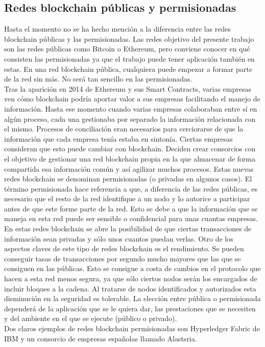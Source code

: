 \subsection{Redes blockchain públicas y permisionadas}
Hasta el momento no se ha hecho mención a la diferencia entre las redes blockchain públicas y las permisionadas. Las redes objetivo del presente trabajo son las redes públicas como Bitcoin o Ethereum, pero conviene conocer en qué consisten las permisionadas ya que el trabajo puede tener aplicación también en estas. En una red blockchain pública, cualquiera puede empezar a formar parte de la red sin más. No será tan sencillo en las permisionadas. \\
Tras la aparición en 2014 de Ethereum y sus Smart Contracts, varias empresas ven cómo blockchain podría aportar valor a sus empresas facilitando el manejo de información. Hasta ese momento cuando varias empresas colaboraban entre sí en algún proceso, cada una gestionaba por separado la información relacionada con el mismo. Procesos de conciliación eran necesarios para cerciorarse de que la información que cada empresa tenía estaba en sintonía. Ciertas empresas consideran que esto puede cambiar con blockchain. Deciden crear consorcios con el objetivo de gestionar una red blockchain propia en la que almacenar de forma compartida esa información común y así agilizar muchos procesos.
Estas nuevas redes blockchain se denominan permisionadas (o privadas en algunos casos). El término permisionada hace referencia a que, a diferencia de las redes públicas, es necesario que el resto de la red identifique a un nodo y lo autorice a participar antes de que este forme parte de la red. Esto se debe a que la información que se maneja en esta red puede ser sensible o confidencial para unas cuantas empresas. En estas redes blockchain se abre la posibilidad de que ciertas transacciones de información sean privadas y sólo unos cuantos puedan verlas. Otro de los aspectos claves de este tipo de redes blockchain es el rendimiento. Se pueden conseguir tasas de transacciones por segundo mucho mayores que las que se consiguen en las públicas. Esto se consigue a costa de cambios en el protocolo que hacen a esta red menos segura, ya que sólo ciertos nodos serán los encargados de incluir bloques a la cadena. Al tratarse de nodos identificados y autorizados esta disminución en la seguridad es tolerable. La elección entre pública o permisionada dependerá de la aplicación que se le quiera dar, las prestaciones que se necesiten y del ambiente en el que se ejecute (público o privado). \\
Dos claros ejemplos de redes blockchain permisionadas son Hyperledger Fabric de IBM y un consorcio de empresas españolas llamado Alastsria.

